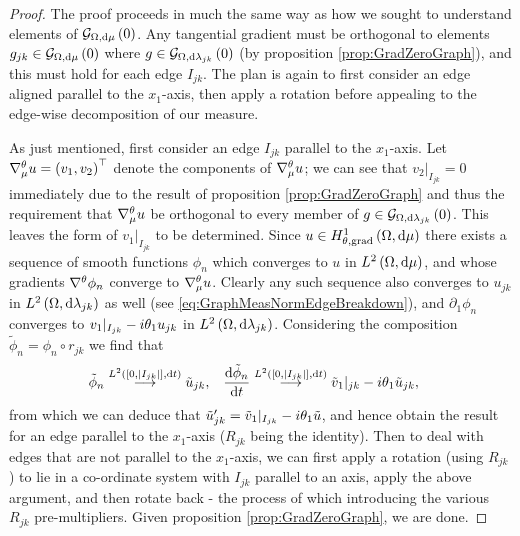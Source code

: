 \begin{proof}
	The proof proceeds in much the same way as how we sought to understand elements of $\mathcal{G}_{ \Omega, \mathrm{d}\mu}\left( 0 \right)$.
	Any tangential gradient must be orthogonal to elements $g_{jk}\in\mathcal{G}_{ \Omega, \mathrm{d}\mu}\left( 0 \right)$ where $g\in\mathcal{G}_{ \Omega, \mathrm{d}\lambda_{jk}}\left( 0 \right)$ (by proposition \ref{prop:GradZeroGraph}), and this must hold for each edge $I_{jk}$.
	The plan is again to first consider an edge aligned parallel to the $x_1$-axis, then apply a rotation before appealing to the edge-wise decomposition of our measure. \newline
	
	As just mentioned, first consider an edge $I_{jk}$ parallel to the $x_1$-axis. 
	Let $\nabla^{\theta}_\mu u = \left( v_1, v_2 \right)^\top$ denote the components of $\nabla^{\theta}_\mu u$; we can see that $v_2\vert_{I_{jk}}=0$ immediately due to the result of proposition \ref{prop:GradZeroGraph} and thus the requirement that $\nabla^{\theta}_\mu u$ be orthogonal to every member of $g\in\mathcal{G}_{ \Omega, \mathrm{d}\lambda_{jk}}\left( 0 \right)$.
	This leaves the form of $v_1\vert_{I_{jk}}$ to be determined.
	Since $u\in H^1_{\theta, \mathrm{grad}}\left( \Omega, \mathrm{d}\mu \right)$ there exists a sequence of smooth functions $\phi_n$ which converges to $u$ in $L^{2}\left( \Omega,\mathrm{d}\mu \right)$, and whose gradients $\nabla^{\theta}\phi_n$ converge to $\nabla^{\theta}_\mu u$.
	Clearly any such sequence also converges to $u_{jk}$ in $L^{2}\left( \Omega,\mathrm{d}\lambda_{jk} \right)$ as well (see \eqref{eq:GraphMeasNormEdgeBreakdown}), and $\partial_1\phi_n$ converges to $v_1\vert_{I_{jk}}-i\theta_{1}u_{jk}$ in $L^{2}\left( \Omega,\mathrm{d}\lambda_{jk} \right)$.
	Considering the composition $\tilde{\phi}_n = \phi_n \circ r_{jk}$ we find that
	\begin{align*}
		\tilde{\phi}_n \overset{L^{2}\left( \left[ 0,\left\lvert I_{jk} \right\rvert \right],\mathrm{d}t \right)}{\longrightarrow} \tilde{u}_{jk},
		&\quad \dfrac{\mathrm{d}\tilde{\phi}_n}{\mathrm{d}t} \overset{L^{2}\left( \left[ 0,\left\lvert I_{jk} \right\rvert \right],\mathrm{d}t \right)}{\longrightarrow} \tilde{v}_1\vert_{jk} - i\theta_1 \tilde{u}_{jk},
	\end{align*}
	from which we can deduce that $\tilde{u}_{jk}' = \tilde{v}_1\vert_{I_{jk}} - i\theta_1\tilde{u}$, and hence obtain the result for an edge parallel to the $x_1$-axis ($R_{jk}$ being the identity).
	Then to deal with edges that are not parallel to the $x_1$-axis, we can first apply a rotation (using $R_{jk}$) to lie in a co-ordinate system with $I_{jk}$ parallel to an axis, apply the above argument, and then rotate back - the process of which introducing the various $R_{jk}$ pre-multipliers.
	Given proposition \ref{prop:GradZeroGraph}, we are done.
\end{proof}

